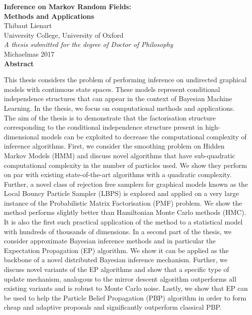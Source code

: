 
\begin{center}
{\Large\bfseries Inference on Markov Random Fields:\\[.2cm]
Methods and Applications}\\[1cm]
{\large Thibaut Lienart}\\[.3cm]
University College, University of Oxford\\[1cm]
\emph{A thesis submitted for the degree of Doctor of Philosophy}\\[.3cm]
Michaelmas 2017\\[1.5cm]

{\large\bfseries Abstract}
\begin{flushleft}
This thesis considers the problem of performing inference on undirected graphical models with continuous state spaces. 
These models represent conditional independence structures that can appear in the context of Bayesian Machine Learning. 
In the thesis, we focus on computational methods and applications. 
The aim of the thesis is to demonstrate that the factorisation structure corresponding to the conditional independence structure present in high-dimensional models can be exploited to decrease the computational complexity of inference algorithms.
First, we consider the smoothing problem on Hidden Markov Models (HMM) and discuss novel algorithms that have sub-quadratic computational complexity in the number of particles used. 
We show they perform on par with existing state-of-the-art algorithms with a quadratic complexity. 
Further, a novel class of rejection free samplers for graphical models known as the Local Bouncy Particle Sampler (LBPS) is explored and applied on a very large instance of the Probabilistic Matrix Factorisation (PMF) problem. 
We show the method performs slightly better than Hamiltonian Monte Carlo methods (HMC). 
It is also the first such practical application of the method to a statistical model with hundreds of thousands of dimensions. 
In a second part of the thesis, we consider approximate Bayesian inference methods and in particular the Expectation Propagation (EP) algorithm. 
We show it can be applied as the backbone of a novel distributed Bayesian inference mechanism. 
Further, we discuss novel variants of the EP algorithms and show that a specific type of update mechanism, analogous to the mirror descent algorithm outperforms all existing variants and is robust to Monte Carlo noise. 
Lastly, we show that EP can be used to help the Particle Belief Propagation (PBP) algorithm in order to form cheap and adaptive proposals and significantly outperform classical PBP. 
\end{flushleft}
\end{center}

